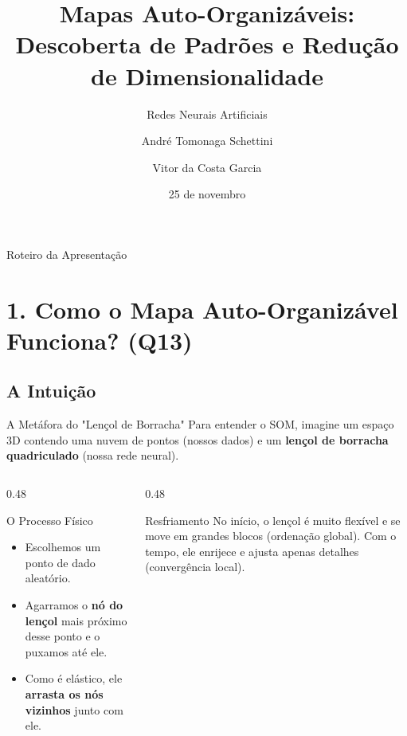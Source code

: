\documentclass[aspectratio=169]{beamer}
\title[Mapas Auto-Organizáveis]{Mapas Auto-Organizáveis: Descoberta de Padrões e Redução de Dimensionalidade}
\subtitle{Redes Neurais Artificiais}
\author[A. Schettini \and V. Garcia]{André Tomonaga Schettini \and Vitor da Costa Garcia}
\institute[UEL]{Universidade Estadual de Londrina (UEL)}
\date{25 de novembro}
\begin{document}
	
	\begin{frame}
		\titlepage
	\end{frame}
	
	\begin{frame}{Roteiro da Apresentação}
		\tableofcontents
	\end{frame}
	
	\section{1. Como o Mapa Auto-Organizável Funciona? (Q13)}
	
	\subsection{A Intuição}
	\begin{frame}{A Metáfora do "Lençol de Borracha"}
		Para entender o SOM, imagine um espaço 3D contendo uma nuvem de pontos (nossos dados) e um \textbf{lençol de borracha quadriculado} (nossa rede neural).
		
		\begin{columns}[T]
			\begin{column}{0.48\textwidth}
				\begin{block}{O Processo Físico}
					\begin{itemize}
						\item Escolhemos um ponto de dado aleatório.
						\item Agarramos o \textbf{nó do lençol} mais próximo desse ponto e o puxamos até ele.
						\item Como é elástico, ele \textbf{arrasta os nós vizinhos} junto com ele.
					\end{itemize}
				\end{block}
			\end{column}
			
			\begin{column}{0.48\textwidth}
				\begin{alertblock}{Resfriamento}
					No início, o lençol é muito flexível e se move em grandes blocos (ordenação global). Com o tempo, ele enrijece e ajusta apenas detalhes (convergência local).
				\end{alertblock}
			\end{column}
		\end{columns}
	\end{frame}
	
\end{document}

